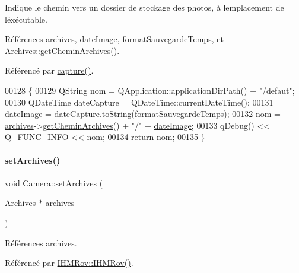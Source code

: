 Indique le chemin vers un dossier de stockage des photos, à l\textquotesingle{}emplacement de l\textquotesingle{}éxécutable. 

Références \hyperlink{class_camera_a5eb3a29aeeab2f2755d0b69ac7cf550a}{archives}, \hyperlink{class_camera_a4433c250847de630592927b6c034f3c8}{date\+Image}, \hyperlink{class_camera_a1056fa6cffd2914d9e5a171bebf5ba7e}{format\+Sauvegarde\+Temps}, et \hyperlink{class_archives_a65dfbaba0123e6530b03bfb70e614c90}{Archives\+::get\+Chemin\+Archives()}.



Référencé par \hyperlink{class_camera_a3ca730dcbd7ea6bfba12931a15066f6c}{capture()}.


\begin{DoxyCode}
00128 \{
00129     QString nom = QApplication::applicationDirPath() + \textcolor{stringliteral}{"/defaut"};
00130     QDateTime dateCapture = QDateTime::currentDateTime();
00131     \hyperlink{class_camera_a4433c250847de630592927b6c034f3c8}{dateImage} = dateCapture.toString(\hyperlink{class_camera_a1056fa6cffd2914d9e5a171bebf5ba7e}{formatSauvegardeTemps});
00132     nom = \hyperlink{class_camera_a5eb3a29aeeab2f2755d0b69ac7cf550a}{archives}->\hyperlink{class_archives_a65dfbaba0123e6530b03bfb70e614c90}{getCheminArchives}() + \textcolor{stringliteral}{"/"} + 
      \hyperlink{class_camera_a4433c250847de630592927b6c034f3c8}{dateImage};
00133     qDebug() << Q\_FUNC\_INFO << nom;
00134     \textcolor{keywordflow}{return} nom;
00135 \}
\end{DoxyCode}
\mbox{\label{class_camera_a66b844eec2b721a6ac23b80cb3fe2426}} 
\paragraph{\texorpdfstring{set\+Archives()}{setArchives()}}
{\footnotesize\ttfamily void Camera\+::set\+Archives (\begin{DoxyParamCaption}\item[{\hyperlink{class_archives}{Archives} $\ast$}]{archives }\end{DoxyParamCaption})}



Références \hyperlink{class_camera_a5eb3a29aeeab2f2755d0b69ac7cf550a}{archives}.



Référencé par \hyperlink{class_i_h_m_rov_a5dac1fb4612866cc61f699a415e0ef6b}{I\+H\+M\+Rov\+::\+I\+H\+M\+Rov()}.


